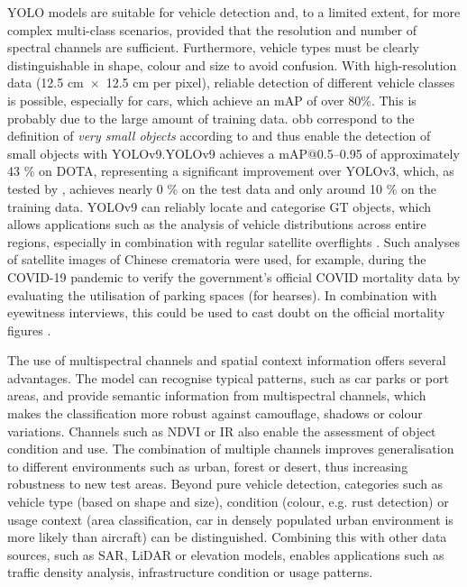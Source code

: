YOLO models are suitable for vehicle detection and, to a limited extent, for more complex multi-class scenarios, provided that the resolution and number of spectral channels are sufficient. Furthermore, vehicle types must be clearly distinguishable in shape, colour and size to avoid confusion. With high-resolution data (12.5 cm~$\times$~12.5 cm per pixel), reliable detection of different vehicle classes is possible, especially for cars, which achieve an mAP of over 80\%. This is probably due to the large amount of training data. \acrshort{obb} correspond to the definition of \textit{very small objects} according to \citeauthor{Chen2017} \cite{Chen2017} and thus enable the detection of small objects with \acrshort{YOLO}v9.YOLOv9 achieves a \acrshort{mAP}@0.5–0.95 of approximately 43 \% on \acrshort{DOTA}, representing a significant improvement over YOLOv3, which, as tested by \citeauthor{Balzer2022} \cite{Balzer2022}, achieves nearly 0 \% on the test data and only around 10 \% on the training data.  \acrshort{YOLO}v9 can reliably locate and categorise \Acrlong{GT} objects, which allows applications such as the analysis of vehicle distributions across entire regions, especially in combination with regular satellite overflights \cite{planet_labs, airbus_neo}. Such analyses of satellite images of Chinese crematoria were used, for example, during the COVID-19 pandemic to verify the government's official COVID mortality data by evaluating the utilisation of parking spaces (for hearses). In combination with eyewitness interviews, this could be used to cast doubt on the official mortality figures \cite{Spiegel_article}.  

The use of multispectral channels and spatial context information offers several advantages. The model can recognise typical patterns, such as car parks or port areas, and provide semantic information from multispectral channels, which makes the classification more robust against camouflage, shadows or colour variations. Channels such as \acrshort{NDVI} or \acrshort{IR} also enable the assessment of object condition and use. The combination of multiple channels improves generalisation to different environments such as urban, forest or desert, thus increasing robustness to new test areas. Beyond pure vehicle detection, categories such as vehicle type (based on shape and size), condition (colour, e.g. rust detection) or usage context (area classification, car in densely populated urban environment is more likely than aircraft) can be distinguished. Combining this with other data sources, such as \acrshort{SAR}, \acrshort{LiDAR} or elevation models, enables applications such as traffic density analysis, infrastructure condition or usage patterns.



